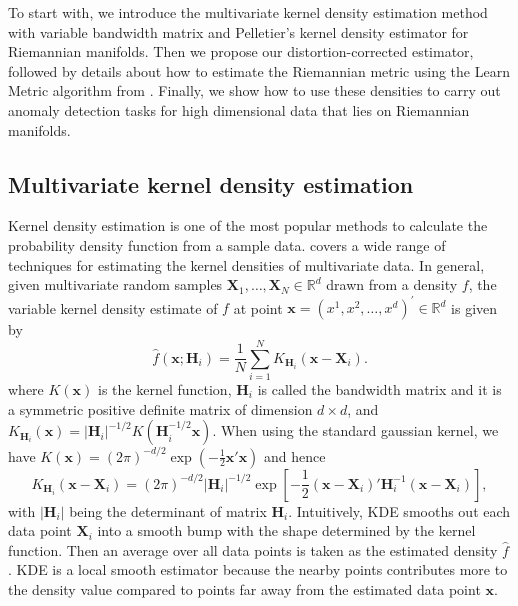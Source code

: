 \documentclass[11pt,a4paper,]{article}
\begin{document}
To start with, we introduce the multivariate kernel density estimation method with variable bandwidth matrix and Pelletier's kernel density estimator for Riemannian manifolds. Then we propose our distortion-corrected estimator, followed by details about how to estimate the Riemannian metric using the Learn Metric algorithm from \textcite{Perrault-Joncas2013-pq}. Finally, we show how to use these densities to carry out anomaly detection tasks for high dimensional data that lies on Riemannian manifolds.

\hypertarget{mvkde}{%
\subsection{Multivariate kernel density estimation}\label{mvkde}}

Kernel density estimation is one of the most popular methods to calculate the probability density function from a sample data. \textcite{Scott2015-vl} covers a wide range of techniques for estimating the kernel densities of multivariate data.
In general, given multivariate random samples \(\pmb{X}_1, \dots, \pmb{X}_N \in \mathbb{R}^d\)
drawn from a density \(f\), the variable kernel density estimate \autocite{Breiman1977-qc,Jones1990-oe,Terrell1992-ut} of \(f\) at point \(\pmb{x}=(x^1, x^2, \dots, x^d)^\prime \in \mathbb{R}^d\) is given by
\begin{equation}
\label{eq:vkde}
\hat{f}(\pmb{x};\pmb{H}_i)=\frac{1}{N}\sum\limits_{i=1}^N K_{\pmb{H}_i}(\pmb{x}-\pmb{X}_i).
\end{equation}
where \(K(\pmb{x})\) is the kernel function, \(\pmb{H}_i\) is called the bandwidth matrix and it is a symmetric positive definite matrix of dimension \(d\times d\), and \(K_{\pmb{H}_i}(\pmb{x}) = |\pmb{H}_i|^{-1/2} K(\pmb{H}_i^{-1/2}\pmb{x})\).
When using the standard gaussian kernel, we have \(K(\pmb{x}) = (2\pi)^{-d/2}\exp(-\frac{1}{2}\pmb{x}'\pmb{x})\) and hence
\begin{equation}
\label{eq:kernel}
K_{\pmb{H}_i}(\pmb{x}-\pmb{X}_i)=(2\pi)^{-d/2}|\pmb{H}_i|^{-1/2}\exp\left[-\frac{1}{2}(\pmb{x}-\pmb{X}_i)'\pmb{H}_i^{-1}(\pmb{x}-\pmb{X}_i)\right],
\end{equation}
with \(|\pmb{H}_i|\) being the determinant of matrix \(\pmb{H}_i\).
Intuitively, KDE smooths out each data point \(\pmb{X}_i\) into a smooth bump with the shape determined by the kernel function. Then an average over all data points is taken as the estimated density \(\hat{f}\). KDE is a local smooth estimator because the nearby points contributes more to the density value compared to points far away from the estimated data point \(\pmb{x}\).
\end{document}
